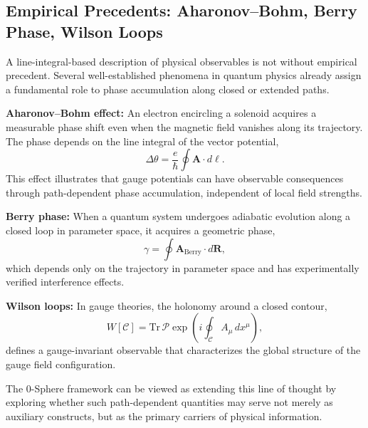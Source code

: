 \documentclass[12pt,letterpaper]{article}
\begin{document}

\subsection{Empirical Precedents: Aharonov--Bohm, Berry Phase, Wilson Loops}
\label{subsec:empirical_precedents}

A line-integral-based description of physical observables is not without empirical precedent. Several well-established phenomena in quantum physics already assign a fundamental role to phase accumulation along closed or extended paths.

\textbf{Aharonov--Bohm effect:} An electron encircling a solenoid acquires a measurable phase shift even when the magnetic field vanishes along its trajectory. The phase depends on the line integral of the vector potential,
\begin{equation}
\Delta \theta = \frac{e}{\hbar} \oint \bm{A} \cdot d\bm{\ell}.
\end{equation}
This effect illustrates that gauge potentials can have observable consequences through path-dependent phase accumulation, independent of local field strengths.

\textbf{Berry phase:} When a quantum system undergoes adiabatic evolution along a closed loop in parameter space, it acquires a geometric phase,
\begin{equation}
\gamma = \oint \bm{A}_{\mathrm{Berry}} \cdot d\bm{R},
\end{equation}
which depends only on the trajectory in parameter space and has experimentally verified interference effects.

\textbf{Wilson loops:} In gauge theories, the holonomy around a closed contour,
\begin{equation}
W[\mathcal{C}] = \mathrm{Tr}\, \mathcal{P} \exp\!\left( i \oint_{\mathcal{C}} A_\mu \, dx^\mu \right),
\end{equation}
defines a gauge-invariant observable that characterizes the global structure of the gauge field configuration.

The 0-Sphere framework can be viewed as extending this line of thought by exploring whether such path-dependent quantities may serve not merely as auxiliary constructs, but as the primary carriers of physical information.

\end{document}
